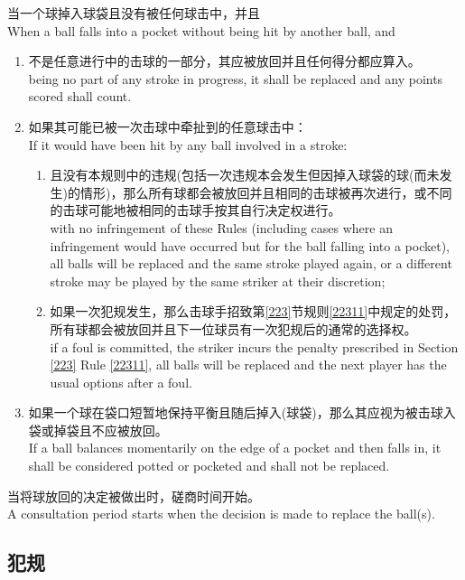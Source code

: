 \noindent 当一个球掉入球袋且没有被任何球击中，并且\\
When a ball falls into a pocket without being hit by another ball, and
\begin{enumerate}[label=(\alph*)]
    \item 不是任意进行中的击球的一部分，其应被放回并且任何得分都应算入。\\
    being no part of any stroke in progress, it shall be replaced and any points scored shall count.
    \item 如果其可能已被一次击球中牵扯到的任意球击中：\\
    If it would have been hit by any ball involved in a stroke:
    \begin{enumerate}[label=(\roman*)]
        \item 且没有本规则中的违规(包括一次违规本会发生但因掉入球袋的球(而未发生)的情形)，那么所有球都会被放回并且相同的击球被再次进行，或不同的击球可能地被相同的击球手按其自行决定权进行。\\
        with no infringement of these Rules (including cases where an infringement would have occurred but for the ball falling into a pocket), all balls will be replaced and the same stroke played again, or a different stroke may be played by the same striker at their discretion;
        \item 如果一次犯规发生，那么击球手招致第\ref{223}节规则\ref{22311}中规定的处罚，所有球都会被放回并且下一位球员有一次犯规后的通常的选择权。\\
        if a foul is committed, the striker incurs the penalty prescribed in Section \ref{223} Rule \ref{22311}, all balls will be replaced and the next player has the usual options after a foul.
    \end{enumerate}
    \item 如果一个球在袋口短暂地保持平衡且随后掉入(球袋)，那么其应视为被击球入袋或掉袋且不应被放回。\\
    If a ball balances momentarily on the edge of a pocket and then falls in, it shall be considered potted or pocketed and shall not be replaced.
\end{enumerate}
\noindent 当将球放回的决定被做出时，磋商时间开始。\\
A consultation period starts when the decision is made to replace the ball(s).

\subsection{犯规}\label{22310}

